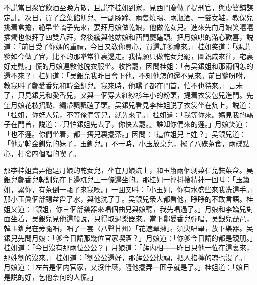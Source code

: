 不説當日衆官飲酒至晚方散，且説李桂姐到家，見西門慶做了提刑官，與虔婆鋪謀定計。次日，買了盒菓餡餅兒、一副豚蹄、兩隻燒鴨、兩瓶酒、一雙女鞋，教保兒挑着盒擔，絶早坐轎子先來，要拜月娘做乾娘，他做乾女兒。進來先向月娘笑嘻嘻插燭也似拜了四雙八拜，然後纔與他姑娘和西門慶磕頭。把月娘哄的滿心歡喜，説道：「前日受了你媽的重禮，今日又敎你費心，買這許多禮來。」桂姐笑道：「媽説爹如今做了官，比不的那喒常往裏邊走。我情願只做乾女兒罷，圖親戚來往，宅裏好走動。」慌的月娘連敎他脱衣服坐。收拾罷，因問桂姐：「有吴銀姐和那兩個怎的還不來？」桂姐道：「吴銀兒我昨日會下他，不知他怎的還不見來。前日爹吩咐，教我呌了鄭愛香兒和韓金釧兒。我來時，他轎子都在門首，怕不也待來。」言未了，只見銀兒和愛香兒，又與一個穿大紅紗衫年小的粉頭，提着衣裳包兒進門。先望月娘花枝招颭、繡帶飄飄磕了頭。吴銀兒看見李桂姐脱了衣裳坐在炕上，説道：「桂姐，你好人兒，不等俺們等兒，就先來了。」桂姐道：「我等你來。媽見我的轎子在門首，説道：『只怕銀姐先去了，你快去罷。』誰知你們來的遲。」月娘笑道：「也不遲。你們坐着，都一搭兒裏擺茶。」因問：「這位姐兒上姓？」吴銀兒道：「他是韓金釧兒的妹子，玉釧兒。」不一時，小玉放桌兒，擺了八碟茶食，兩碟點心，打發四個唱的喫了。

那李桂姐賣弄他是月娘的乾女兒，坐在月娘炕上，和玉簫兩個剝菓仁兒裝菓盒。吴銀兒鄭香兒韓釧兒在下邊杌兒上一條邊坐的。那桂姐一徑抖搜精神一回叫：「玉簫姐，累你，有茶倒一甌子來我喫。」一囬又呌：「小玉姐，你有水盛些來我洗這手。」那小玉眞個㧱錫盆舀了水，與他洗了手。吴銀兒衆人都看他，睜睜的不敢言語。桂姐又道：「銀姐，你三個㧱樂器來唱個曲兒與娘聽，我先唱過了。」月娘和李嬌兒對面坐着，吴銀兒見他這般說，只得取過樂器來。當下鄭愛香兒彈唱，吴銀兒琵琶，韓玉釧兒在旁隨唱，唱了一套〈八聲甘州〉「花遮翠擁」。須臾唱畢，放下樂器。吴銀兒先問月娘：「爹今日請那幾位官家喫酒？」月娘道：「你爹今日請的都是親朋。」桂姐道：「今日沒有那兩位公公？」月娘道：「薛内相——昨日只他一位在這裏來，那姓劉的沒來。」桂姐道：「劉公公還好，那薛公公快頑，把人掐擰的魂也沒了。」月娘道：「左右是個内官家，又沒什麽，隨他擺弄一囬子就是了。」桂姐道：「娘且是説的好，乞他奈何的人慌。」

